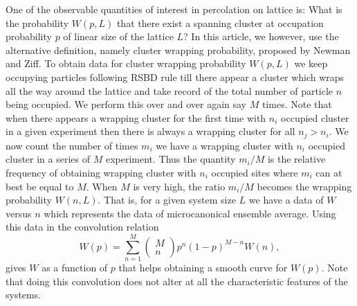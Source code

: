﻿\documentclass[twocolumn,showpacs,preprintnumbers,amsmath,amssymb]{revtex4}
\begin{document}
One of the observable quantities of interest in percolation on lattice is: What is the probability
$W(p,L)$ that there exist a spanning cluster at occupation probability $p$ of linear size of the lattice $L$? 
In this article, we however, use the alternative definition, namely cluster wrapping probability, proposed
by Newman and Ziff. To obtain data for cluster wrapping probability $W(p,L)$ 
we keep occupying particles following RSBD rule till there appear a cluster which wraps all the way
around the lattice and take record of the total number of particle $n$ being occupied.  We perform this
over and over again say $M$ times. Note that when there appears a wrapping cluster for the first time 
with $n_i$ occupied cluster in a given experiment then there is always a wrapping cluster for all $n_j>n_i$. 
We now count the number of times $m_i$ we have a wrapping cluster with $n_i$ occupied cluster
in a series of $M$ experiment. Thus the quantity $m_i/M$ is the relative
frequency of obtaining wrapping cluster with $n_{i}$ occupied sites where $m_i$ can at best be equal
to $M$. When $M$ is very high, the ratio $m_i/M$ becomes the wrapping 
probability $W(n,L)$. That is, for a given system size $L$ we have a data of $W$ versus $n$ which
represents the data of microcanonical ensemble average. Using this data in the convolution relation
\begin{equation}
\label{eq:convolution}
W(p)=\sum_{n=1}^M \left( \begin{array}{c}
M \\ n \end{array}\right ) p^n(1-p)^{M-n} W(n),
\end{equation}
gives $W$ as a function of $p$ that helps obtaining a smooth curve for $W(p)$. Note
that doing this convolution does not alter at all the characteristic features of the systems.  
\end{document}
